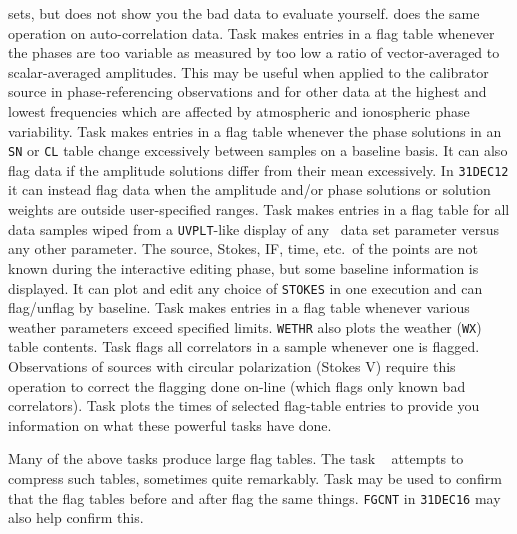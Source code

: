     sets, but does not show you the bad data to evaluate yourself.
    {\tt {}} does the same operation on auto-correlation
    data.
\Item Task {\tt {}} makes entries in a flag table whenever
    the phases are too variable as measured by too low a ratio of
    vector-averaged to scalar-averaged amplitudes.  This may be useful
    when applied to the calibrator source in phase-referencing
    observations and for other data at the highest and lowest
    frequencies which are affected by atmospheric and ionospheric phase
    variability.
\Item Task {\tt {}} makes entries in a flag table whenever
    the phase solutions in an {\tt SN} or {\tt CL} table change
    excessively between samples on a baseline basis.  It can also flag
    data if the amplitude solutions differ from their mean
    excessively.  In {\tt 31DEC12} it can instead flag data when the
    amplitude and/or phase solutions or solution weights are outside
    user-specified ranges.
\Item Task {\tt {}} makes entries in a flag table for all
    data samples wiped from a {\tt UVPLT}-like display of any \uv\
    data set parameter versus any other parameter.  The source,
    Stokes, IF, time, etc.~of the points are not known during the
    interactive editing phase, but some baseline information is
    displayed.  It can plot and edit any choice of {\tt STOKES} in one
    execution and can flag/unflag by baseline.
\Item Task {\tt {}} makes entries in a flag table whenever
    various weather parameters exceed specified limits.  {\tt WETHR}
    also plots the weather ({\tt WX}) table contents.
\Item Task {\tt {}} flags all correlators in a sample
    whenever one is flagged.  Observations of sources with circular
    polarization (Stokes V) require this operation to correct the
    flagging done on-line (which flags only known bad correlators).
\Item Task {\tt \tndx{FGPLT}} plots the times of selected flag-table
    entries to provide you information on what these powerful tasks
    have done.
\xeit

Many of the above tasks produce large flag tables.  The task {\tt
\tndx{REFLG}} attempts to compress such tables, sometimes quite
remarkably.  Task {\tt {}} may be used to confirm that the
flag tables before and after flag the same things.  {\tt FGCNT} in
{\tt 31DEC16} may also help confirm this.



